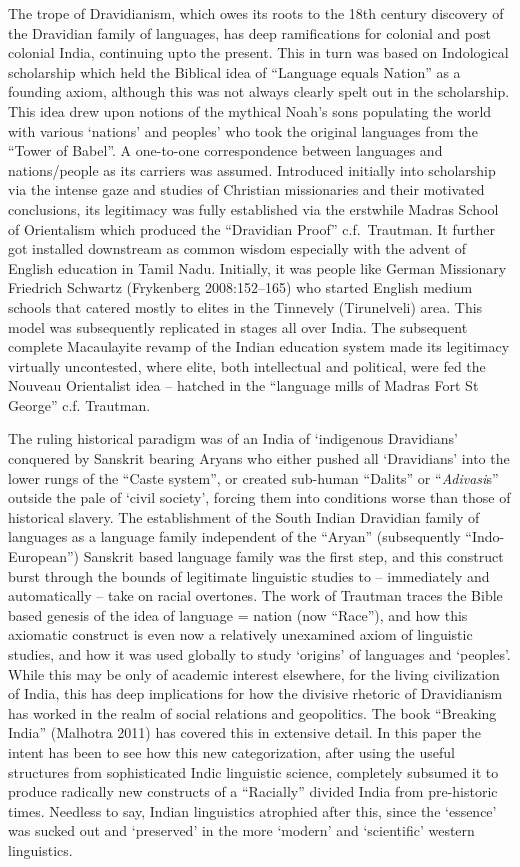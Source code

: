 The trope of Dravidianism, which owes its roots to the 18th century discovery of the Dravidian family of languages, has deep ramifications for colonial and post colonial India, continuing upto the present. This in turn was based on Indological scholarship which held the Biblical idea of “Language equals Nation” as a founding axiom, although this was not always clearly spelt out in the scholarship. This idea drew upon notions of the mythical Noah’s sons populating the world with various ‘nations’ and peoples’ who took the original languages from the “Tower of Babel”. A one-to-one correspondence between languages and nations/people as its carriers was assumed. Introduced initially into scholarship via the intense gaze and studies of Christian missionaries and their motivated conclusions, its legitimacy was fully established via the erstwhile Madras School of Orientalism which produced the “Dravidian Proof” c.f.\ Trautman. It further got installed downstream as common wisdom especially with the advent of English education in Tamil Nadu. Initially, it was people like German Missionary Friedrich Schwartz (Frykenberg 2008:152–165) who started English medium schools that catered mostly to elites in the Tinnevely (Tirunelveli) area. This model was subsequently replicated in stages all over India. The subsequent complete Macaulayite revamp of the Indian education system made its legitimacy virtually uncontested, where elite, both intellectual and political, were fed the Nouveau Orientalist idea – hatched in the “language mills of Madras Fort St George” c.f. Trautman.

The ruling historical paradigm was of an India of ‘indigenous Dravidians’ conquered by Sanskrit bearing Aryans who either pushed all ‘Dravidians’ into the lower rungs of the “Caste system”, or created sub-human “Dalits” or “\textit{Adivasi}s” outside the pale of ‘civil society’, forcing them into conditions worse than those of historical slavery. The establishment of the South Indian Dravidian family of languages as a language family independent of the “Aryan” (subsequently “Indo-European”) Sanskrit based language family was the first step, and this construct burst through the bounds of legitimate linguistic studies to – immediately and automatically – take on racial overtones. The work of Trautman traces the Bible based genesis of the idea of language = nation (now “Race”), and how this axiomatic construct is even now a relatively unexamined axiom of linguistic studies, and how it was used globally to study ‘origins’ of languages and ‘peoples’. While this may be only of academic interest elsewhere, for the living civilization of India, this has deep implications for how the divisive rhetoric of Dravidianism has worked in the realm of social relations and geopolitics. The book “Breaking India” (Malhotra 2011) has covered this in extensive detail. In this paper the intent has been to see how this new categorization, after using the useful structures from sophisticated Indic linguistic science, completely subsumed it to produce radically new constructs of a “Racially” divided India from pre-historic times. Needless to say, Indian linguistics atrophied after this, since the ‘essence’ was sucked out and ‘preserved’ in the more ‘modern’ and ‘scientific’ western linguistics.


